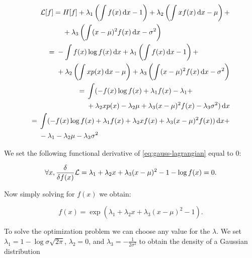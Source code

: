\begin{align}
\begin{split}
\gL[f] ={}& H[f] + \lambda_1 \left( \int f(x) \dx - 1 \right) + \lambda_2 \left( \int x f(x) \dx - \mu \right) + \\
 &+ \lambda_3 \left( \int (x - \mu)^2 f(x) \dx - \sigma^2 \right)
\end{split} \\
%
\begin{split}
={}& -\int f(x) \log f(x) \dx  + \lambda_1 \left( \int f(x) \dx - 1 \right) + \\
&+ \lambda_2 \left( \int x p(x) \dx - \mu \right) + \lambda_3 \left( \int (x - \mu)^2  f(x) \dx - \sigma^2 \right)
\end{split} \\
%
\begin{split}
={}& \int ( - f(x) \log f(x) + \lambda_1 f(x) - \lambda_1 + \\
&+ \lambda_2 x p(x) - \lambda_2 \mu + \lambda_3 (x - \mu)^2  f(x) - \lambda_3 \sigma^2 ) \dx \\
\end{split} \\
%
\begin{split}
={}& \int ( - f(x)\log f(x) + \lambda_1 f(x) + \lambda_2 x f(x) + \lambda_3 (x - \mu)^2  f(x) ) \dx + \\
&- \lambda_1 - \lambda_2 \mu - \lambda_3 \sigma^2 \label{eq:gauss-lagrangian}
\end{split}
\end{align}

 We set the following functional derivative of \eqref{eq:gauss-lagrangian} equal to $0$:

\begin{equation}
\forall x, \frac{\delta}{\delta f(x)} {\mathcal{L}} = \lambda_1 + \lambda_2 x + \lambda_3 (x - \mu)^2 - 1 - \log f(x) = 0.
\end{equation}

Now simply solving for $f(x)$ we obtain:

\begin{equation}
f(x) = \exp \left( \lambda_1 + \lambda_2 x + \lambda_3 (x - \mu)^2 - 1 \right).
\end{equation}

To solve the optimization problem we can choose any value for the $\lambda$. We set $\lambda_1 = 1 - \log \sigma \sqrt{2 \pi}$, $\lambda_2 = 0$, and $\lambda_3 = - \frac{1}{2 \sigma^2}$ to obtain the density of a Gaussian distribution

